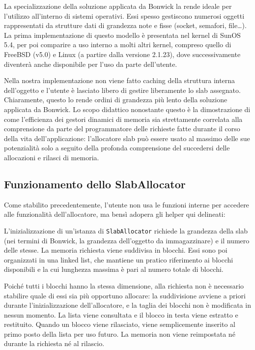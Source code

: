 La specializzazione della soluzione applicata da Bonwick la rende ideale per l’utilizzo all’interno di sistemi operativi. Essi spesso gestiscono numerosi oggetti rappresentati da strutture dati di grandezza note e fisse (socket, semafori, file…). La prima implementazione di questo modello è presentata nel kernel di SunOS 5.4, per poi comparire a uso interno a molti altri kernel, compreso quello di FreeBSD (v5.0) e Linux (a partire dalla versione 2.1.23), dove successivamente diventerà anche disponibile per l’uso da parte dell’utente.

Nella nostra implementazione non viene fatto caching della struttura interna dell’oggetto e l’utente è lasciato libero di gestire liberamente lo slab assegnato. Chiaramente, questo lo rende ordini di grandezza più lento della soluzione applicata da Bonwick. Lo scopo didattico nonostante questo è la dimostrazione di come l’efficienza dei gestori dinamici di memoria sia strettamente correlata alla comprensione da parte del programmatore delle richieste fatte durante il corso della vita dell’applicazione: l’allocatore slab può essere usato al massimo delle sue potenzialità solo a seguito della profonda comprensione del succedersi delle allocazioni e rilasci di memoria.

\subsection{Funzionamento dello SlabAllocator}

Come stabilito precedentemente, l’utente non usa le funzioni interne per accedere alle funzionalità dell’allocatore, ma bensì adopera gli helper qui delineati:

L’inizializzazione di un’istanza di \texttt{SlabAllocator} richiede la grandezza della slab (nei termini di Bonwick, la grandezza dell’oggetto da immagazzinare) e il numero delle stesse. La memoria richiesta viene suddivisa in blocchi. Essi sono poi organizzati in una linked list, che mantiene un pratico riferimento ai blocchi disponibili e la cui lunghezza massima è pari al numero totale di blocchi.

Poiché tutti i blocchi hanno la stessa dimensione, alla richiesta non è necessario stabilire quale di essi sia più opportuno allocare: la suddivisione avviene a priori durante l’inizializzazione dell’allocatore, e la taglia dei blocchi non è modificata in nessun momento. La lista viene consultata e il blocco in testa viene estratto e restituito. Quando un blocco viene rilasciato, viene semplicemente inserito al primo posto della lista per uso futuro. La memoria non viene reimpostata né durante la richiesta né al rilascio.

